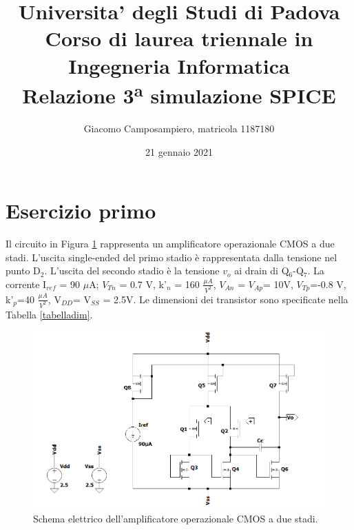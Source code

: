 \documentclass[a4paper,10pt]{article}
\begin{document}
%

   
   \title{{\large Universita' degli Studi di Padova \\ } {\normalsize Corso di laurea triennale in Ingegneria Informatica}\\ \vspace{1.8cm} \textbf{ Relazione 3\textsuperscript{a} simulazione SPICE}}

   \author{Giacomo Camposampiero, matricola 1187180}
          
   \date{21 gennaio 2021}

   \maketitle
      
   \vspace{1.8cm}   
   \renewcommand{\contentsname}{Indice}      
   \tableofcontents
   
   \newpage
  
\section{Esercizio primo}
Il circuito in Figura \ref{fig:ckt1} rappresenta un amplificatore operazionale CMOS a due stadi. L'uscita single-ended del primo stadio è rappresentata dalla tensione nel punto D$_2$. L’uscita del secondo stadio è la tensione $v_o$ ai drain di Q$_6$-Q$_7$. La corrente I$_{ref}$ = 90 $\mu$A; $V_{Tn}$ = 0.7 V, k’$_n$ = 160 $\frac{\mu A}{V^2}$, $V_{An}$ = $V_{Ap}$= 10V, $V_{Tp}$=-0.8 V, k’$_p$=40 $\frac{\mu A}{V^2}$, V$_{DD}$= V$_{SS}$ = 2.5V. Le dimensioni dei transistor sono specificate nella Tabella \ref{tabelladim}.
\begin{figure}[h!]
  	\centering
 	\includegraphics[width=0.9\linewidth]{ckt1.png}
  	\caption{Schema elettrico dell'amplificatore operazionale CMOS a due stadi.}
  	\label{fig:ckt1}
\end{figure}
\end{document}
